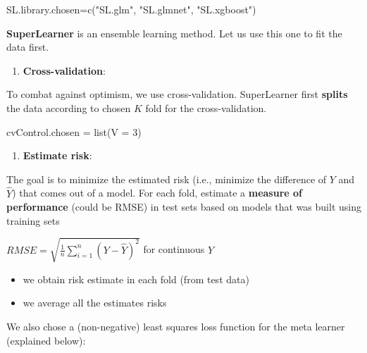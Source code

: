 \documentclass[
]{book}
\newenvironment{Shaded}{\begin{snugshade}}{\end{snugshade}}
\newcommand{\AttributeTok}[1]{\textcolor[rgb]{0.77,0.63,0.00}{#1}}
\newcommand{\DecValTok}[1]{\textcolor[rgb]{0.00,0.00,0.81}{#1}}
\newcommand{\FunctionTok}[1]{\textcolor[rgb]{0.00,0.00,0.00}{#1}}
\newcommand{\NormalTok}[1]{#1}
\newcommand{\OtherTok}[1]{\textcolor[rgb]{0.56,0.35,0.01}{#1}}
\newcommand{\StringTok}[1]{\textcolor[rgb]{0.31,0.60,0.02}{#1}}
\providecommand{\tightlist}{%
  \setlength{\itemsep}{0pt}\setlength{\parskip}{0pt}}
\begin{document}
\begin{Shaded}
\begin{Highlighting}[]
\NormalTok{SL.library.chosen}\OtherTok{=}\FunctionTok{c}\NormalTok{(}\StringTok{"SL.glm"}\NormalTok{, }\StringTok{"SL.glmnet"}\NormalTok{, }\StringTok{"SL.xgboost"}\NormalTok{)}
\end{Highlighting}
\end{Shaded}

\textbf{SuperLearner} is an ensemble learning method. Let us use this one to fit the data first.

\begin{enumerate}
\def\labelenumi{\arabic{enumi}.}
\setcounter{enumi}{1}
\tightlist
\item
  \textbf{Cross-validation}:
\end{enumerate}

To combat against optimism, we use cross-validation. SuperLearner first \textbf{splits} the data according to chosen \(K\) fold for the cross-validation.

\begin{Shaded}
\begin{Highlighting}[]
\NormalTok{cvControl.chosen }\OtherTok{=} \FunctionTok{list}\NormalTok{(}\AttributeTok{V =} \DecValTok{3}\NormalTok{)}
\end{Highlighting}
\end{Shaded}

\begin{enumerate}
\def\labelenumi{\arabic{enumi}.}
\setcounter{enumi}{2}
\tightlist
\item
  \textbf{Estimate risk}:
\end{enumerate}

The goal is to minimize the estimated risk (i.e., minimize the difference of \(Y\) and \(\hat{Y}\)) that comes out of a model. For each fold, estimate a \textbf{measure of performance} (could be RMSE) in test sets based on models that was built using training sets

\(RMSE = \sqrt{\frac{1}{n}\sum_{i=1}^n (Y - \hat{Y})^2}\) for continuous \(Y\)

\begin{itemize}
\tightlist
\item
  we obtain risk estimate in each fold (from test data)
\item
  we average all the estimates risks
\end{itemize}

We also chose a (non-negative) least squares loss function for the meta learner (explained below):
\end{document}
